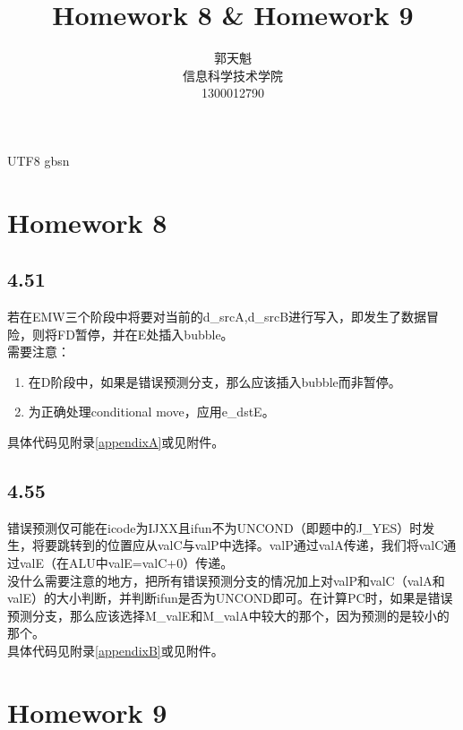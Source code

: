 \documentclass {article}
\begin{document}
  \begin {CJK*} {UTF8} {gbsn}
		\title {\textbf {\Huge Homework 8 \& Homework 9}}
		\author {郭天魁 \\ 信息科学技术学院 \\ 1300012790}

		\maketitle

		\section{Homework 8}
			\subsection{4.51}
				若在EMW三个阶段中将要对当前的d\_srcA,d\_srcB进行写入，即发生了数据冒险，则将FD暂停，并在E处插入bubble。\\

				需要注意：
				\begin{enumerate}
					\item 在D阶段中，如果是错误预测分支，那么应该插入bubble而非暂停。
					\item 为正确处理conditional move，应用e\_dstE。
				\end{enumerate}

				具体代码见附录\ref{appendixA}或见附件。\\

			\subsection{4.55}
				错误预测仅可能在icode为IJXX且ifun不为UNCOND（即题中的J\_YES）时发生，将要跳转到的位置应从valC与valP中选择。valP通过valA传递，我们将valC通过valE（在ALU中valE=valC+0）传递。\\

				没什么需要注意的地方，把所有错误预测分支的情况加上对valP和valC（valA和valE）的大小判断，并判断ifun是否为UNCOND即可。在计算PC时，如果是错误预测分支，那么应该选择M\_valE和M\_valA中较大的那个，因为预测的是较小的那个。\\

				具体代码见附录\ref{appendixB}或见附件。\\
				
		\section{Homework 9}

\end{CJK*}
\end{document}
